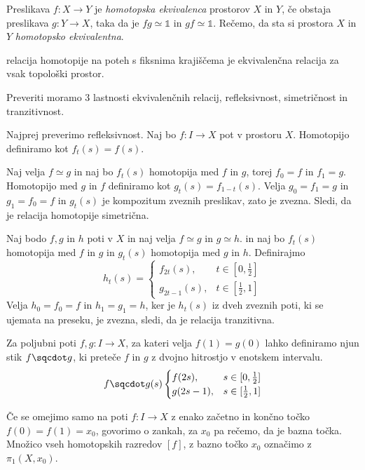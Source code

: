 \begin{definicija}
    Preslikava  $f : X \rightarrow Y$ je \textit{homotopska ekvivalenca} prostorov $X$ in $Y$, če obstaja preslikava $g: Y\rightarrow X$, taka da
    je $f g \simeq \mathds{1}$ in $gf \simeq \mathds{1}$. Rečemo, da sta si prostora $X$ in
    $Y$  \textit{homotopsko ekvivalentna}.
\end{definicija}

\begin{izrek}
    relacija homotopije na poteh s fiksnima krajiščema je ekvivalenčna relacija za vsak topološki prostor.
\end{izrek}

\begin{dokaz}
    Preveriti moramo 3 lastnosti ekvivalenčnih relacij, refleksivnost, simetričnost in tranzitivnost.

    Najprej preverimo refleksivnost. Naj bo $f : I \rightarrow X$ pot v prostoru $X$. Homotopijo definiramo kot $f_t(s)=f(s)$.

    Naj velja $f \simeq g$ in naj bo $f_t(s)$ homotopija med $f$ in $g$, torej $f_0=f$ in $f_1=g$. Homotopijo med $g$ in $f$ definiramo kot $g_t(s)=f_{1-t}(s)$. Velja $g_0=f_1=g$ in $g_1=f_0=f$ in $g_t(s)$ je kompozitum zveznih preslikav, zato je zvezna. Sledi, da je relacija homotopije simetrična.

    Naj bodo $f, g \text{ in } h$ poti v $X$ in naj velja $f \simeq g$ in $g \simeq h$. in naj bo $f_t(s)$ homotopija med $f$ in $g$ in $g_t(s)$ homotopija med $g$ in $h$. Definirajmo 
    $$h_t(s)=\begin{cases}
        f_{2t}(s), & t \in [0,\frac{1}{2}] \\
        g_{2t-1}(s), & t \in [\frac{1}{2},1]
    \end{cases}
    $$
    Velja $h_0=f_0=f$ in $h_1=g_1=h$, ker je $h_t(s)$ iz dveh zveznih poti, ki se ujemata na preseku, je zvezna, sledi, da je relacija tranzitivna.
\end{dokaz}

Za poljubni poti $f,g : I \rightarrow X$, za kateri velja $f(1) = g(0)$ lahko definiramo njun stik $f\sqcdot g$, ki preteče $f$ in $g$ z dvojno hitrostjo v enotskem intervalu.
$$ f\sqcdot g(s) \begin{cases}
    f(2s), &s \in [0,\frac{1}{2}] \\
    g(2s-1), & s \in [\frac{1}{2},1]
\end{cases}
$$

Če se omejimo samo na poti $f:I \rightarrow X$ z enako začetno in končno točko $f(0) = f(1) = x_0$, govorimo o zankah, za $x_0$ pa rečemo, da je bazna točka.
Množico vseh homotopskih razredov $[f]$, z bazno točko $x_0$ označimo z $\pi_1(X,x_0)$.

